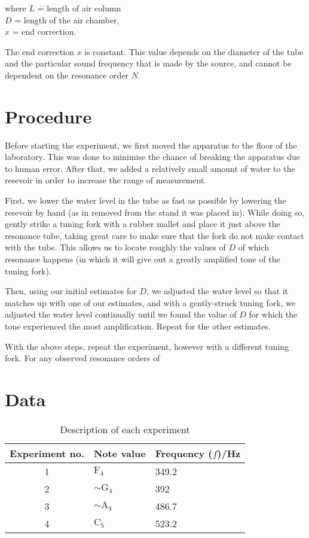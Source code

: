 \documentclass[letter]{article}
\numberwithin{equation}{section}
\begin{document}
\begin{tabbing}
  where \= \(L\) \= = length of air column \\
  \> \(D\) \> = length of the air chamber, \\
  \> \(x\) \> = end correction.
\end{tabbing}

The end correction \(x\) is constant. This value depends on the diameter of the tube and the particular sound frequency that is made by the source, and cannot be dependent on the resonance order \(N\).

\section{Procedure}
Before starting the experiment, we first moved the apparatus to the floor of the laboratory. This was done to minimise the chance of breaking the apparatus due to human error. After that, we added a relatively small amount of water to the resevoir in order to increase the range of measurement.

First, we lower the water level in the tube as fast as possible by lowering the resevoir by hand (as in removed from the stand it was placed in). While doing so, gently strike a tuning fork with a rubber mallet and place it just above the resonance tube, taking great care to make sure that the fork do not make contact with the tube. This allows us to locate roughly the values of \(D\) of which resonance happens (in which it will give out a greatly amplified tone of the tuning fork).

Then, using our initial estimates for \(D\), we adjusted the water level so that it matches up with one of our estimates, and with a gently-struck tuning fork, we adjusted the water level continually until we found the value of \(D\) for which the tone experienced the most amplification. Repeat for the other estimates.

With the above steps, repeat the experiment, however with a different tuning fork. For any observed resonance orders of

\section{Data}
\begin{table}[!h]
  \centering
  \begin{tabular}{|c|l|l|}
    \hline
    Experiment no.  & Note value            & Frequency (\(f\))/\si{Hz} \\
    \hline
    1               & \(\mathrm{F}_4\)      & 349.2 \\
    2               & \(\sim \mathrm{G}_4\) & 392 \\
    3               & \(\sim \mathrm{A}_4\) & 486.7 \\
    4               & \(\mathrm{C}_5\)      & 523.2 \\
    \hline
  \end{tabular}
  \caption{Description of each experiment}
  \label{table:d1}
\end{table}
\end{document}
